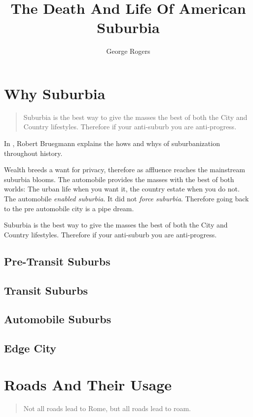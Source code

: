 \documentclass{amsbook}
\title{The Death And Life Of American Suburbia}
\author{George Rogers}
\date{}
\begin{document}
\setcounter{chapter}{-1}
\dominitoc
\maketitle

\tableofcontents

\chapter{Why Suburbia}
\begin{quotation}
    Suburbia is the best way to give the masses the best of both the City and Country lifestyles.
    Therefore if your anti-suburb you are anti-progress.
\end{quotation}
\minitoc

In \cite{rBruegmann05}, Robert Bruegmann explains the hows and whys of suburbanization throughout history.

Wealth breeds a want for privacy,
therefore as affluence reaches the mainstream suburbia blooms.
The automobile provides the masses with the best of both worlds:
The urban life when you want it, the country estate when you do not.
The automobile \emph{enabled suburbia}. It did not \emph{force suburbia}.
Therefore going back to the pre automobile city is a pipe dream.

Suburbia is the best way to give the masses the best of both the City and Country lifestyles.
Therefore if your anti-suburb you are anti-progress.
\section{Pre-Transit Suburbs}
\section{Transit Suburbs}
\section{Automobile Suburbs}
\section{Edge City}
\chapter{Roads And Their Usage}
\begin{quotation}
    Not all roads lead to Rome, but all roads lead to roam.
\end{quotation}
\minitoc
\end{document}
